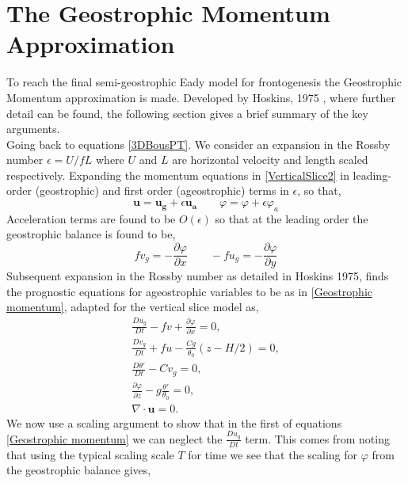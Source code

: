 \section{The Geostrophic Momentum Approximation \label{Geostrophic}}
To reach the final semi-geostrophic Eady model for frontogenesis the Geostrophic Momentum approximation is made. Developed by Hoskins, 1975 \cite{Hoskins1975}, where further detail can be found, the following section gives a brief summary of the key arguments.\\
\linebreak
Going back to equations \ref{3DBousPT}. We consider an expansion in the Rossby number $\epsilon = U/fL$ where $U$ and $L$ are horizontal velocity and length scaled respectively. Expanding the momentum equations in \ref{VerticalSlice2} in leading-order (geostrophic) and first order (ageostrophic) terms in $\epsilon$, so that,
\begin{equation*}
	\bm{u} = \bm{u_g} + \epsilon \bm{u_a} \qquad \varphi = \varphi +\epsilon \varphi_a
\end{equation*}
Acceleration terms are found to be $O(\epsilon)$ so that at the leading order the geostrophic balance is found to be,
\begin{equation}
	fv_g  = -\frac{\partial \varphi}{\partial x} \qquad
	-fu_g  = -\frac{\partial \varphi}{\partial y}
\end{equation}
Subsequent expansion in the Rossby number as detailed in Hoskins 1975, \cite{Hoskins1975} finds the prognostic equations for ageostrophic variables to be as in \ref{Geostrophic momentum}, adapted for the vertical slice model as,
\begin{equation}
\begin{aligned}
\frac{Du_g}{Dt}- fv + \frac{\partial \varphi}{\partial x} = 0,\\
\frac{Dv_g}{Dt} + fu -\frac{Cg}{\theta _0}\left(z-H/2\right) = 0,\\
\frac{D\theta'}{Dt} - Cv_g = 0,\\
\frac{\partial \varphi}{\partial z} - g\frac{\theta'}{\theta_0} = 0,\\
\nabla \cdot \bm{u} = 0.
\end{aligned}
\label{Geostrophic momentum}
\end{equation}
We now use a scaling argument to show that in the first of equations \ref{Geostrophic momentum} we can neglect the $\frac{Du_g}{Dt}$ term. This comes from noting that using the typical scaling scale $T$ for time we see that the scaling for $\varphi$ from the geostrophic balance gives,
